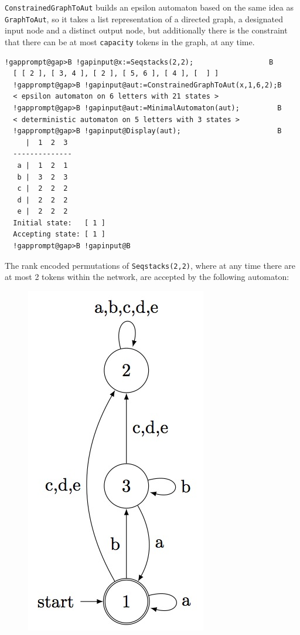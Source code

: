 \documentclass[a4paper,11pt]{report}
\begin{document}
{{{ \texttt{ConstrainedGraphToAut} builds an epsilon automaton based on the same idea as \texttt{GraphToAut}, so it takes a list representation of a directed graph, a designated input
node and a distinct output node, but additionally there is the constraint that
there can be at most \texttt{capacity} tokens in the graph, at any time. 
\begin{Verbatim}[commandchars=!@B,fontsize=\small,frame=single,label=Example]
  !gapprompt@gap>B !gapinput@x:=Seqstacks(2,2);                  B
  [ [ 2 ], [ 3, 4 ], [ 2 ], [ 5, 6 ], [ 4 ], [  ] ]
  !gapprompt@gap>B !gapinput@aut:=ConstrainedGraphToAut(x,1,6,2);B
  < epsilon automaton on 6 letters with 21 states >
  !gapprompt@gap>B !gapinput@aut:=MinimalAutomaton(aut);         B
  < deterministic automaton on 5 letters with 3 states >
  !gapprompt@gap>B !gapinput@Display(aut);                       B
     |  1  2  3  
  --------------
   a |  1  2  1  
   b |  3  2  3  
   c |  2  2  2  
   d |  2  2  2  
   e |  2  2  2  
  Initial state:   [ 1 ]
  Accepting state: [ 1 ]
  !gapprompt@gap>B !gapinput@B
\end{Verbatim}
 
      The rank encoded permutations of \texttt{Seqstacks(2,2)}, where at any time there are at most 2 tokens within the network, are accepted by
      the following automaton:
      \begin{figure}[H] \begin{center} \leavevmode \includegraphics[scale=0.75]{img/ss22c2aut.jpg} \end{center} \end{figure}
      
}}}
\end{document}
